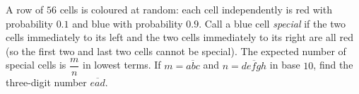 A row of $56$ cells is coloured at random: each cell independently is red with probability $0.1$ and blue with probability $0.9$. Call a blue cell \emph{special} if the two cells immediately to its left and the two cells immediately to its right are all red (so the first two and last two cells cannot be special). The expected number of special cells is $\dfrac mn$ in lowest terms. If $m=\overline{abc}$ and $n=\overline{defgh}$ in base $10$, find the three-digit number $\overline{ead}$.
